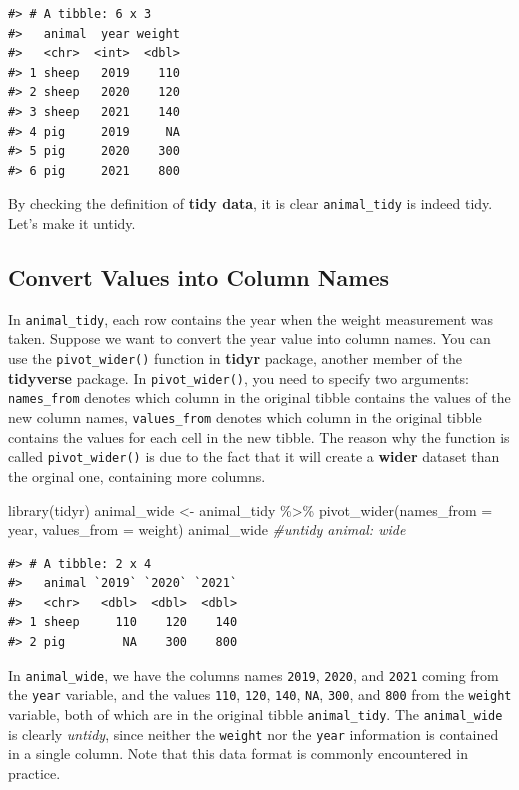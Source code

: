 \documentclass[
]{book}
\newenvironment{Shaded}{\begin{snugshade}}{\end{snugshade}}
\newcommand{\AttributeTok}[1]{\textcolor[rgb]{0.77,0.63,0.00}{#1}}
\newcommand{\CommentTok}[1]{\textcolor[rgb]{0.56,0.35,0.01}{\textit{#1}}}
\newcommand{\FunctionTok}[1]{\textcolor[rgb]{0.00,0.00,0.00}{#1}}
\newcommand{\NormalTok}[1]{#1}
\newcommand{\OtherTok}[1]{\textcolor[rgb]{0.56,0.35,0.01}{#1}}
\newcommand{\SpecialCharTok}[1]{\textcolor[rgb]{0.00,0.00,0.00}{#1}}
\begin{document}
\begin{verbatim}
#> # A tibble: 6 x 3
#>   animal  year weight
#>   <chr>  <int>  <dbl>
#> 1 sheep   2019    110
#> 2 sheep   2020    120
#> 3 sheep   2021    140
#> 4 pig     2019     NA
#> 5 pig     2020    300
#> 6 pig     2021    800
\end{verbatim}

By checking the definition of \textbf{tidy data}, it is clear \texttt{animal\_tidy} is indeed tidy. Let's make it untidy.

\hypertarget{tidy-wide}{%
\subsection{Convert Values into Column Names}\label{tidy-wide}}

In \texttt{animal\_tidy}, each row contains the year when the weight measurement was taken. Suppose we want to convert the year value into column names. You can use the \texttt{pivot\_wider()} function in \textbf{tidyr} package, another member of the \textbf{tidyverse} package. In \texttt{pivot\_wider()}, you need to specify two arguments: \texttt{names\_from} denotes which column in the original tibble contains the values of the new column names, \texttt{values\_from} denotes which column in the original tibble contains the values for each cell in the new tibble. The reason why the function is called \texttt{pivot\_wider()} is due to the fact that it will create a \textbf{wider} dataset than the orginal one, containing more columns.

\begin{Shaded}
\begin{Highlighting}[]
\FunctionTok{library}\NormalTok{(tidyr)}
\NormalTok{animal\_wide }\OtherTok{\textless{}{-}}\NormalTok{ animal\_tidy }\SpecialCharTok{\%\textgreater{}\%} \FunctionTok{pivot\_wider}\NormalTok{(}\AttributeTok{names\_from =}\NormalTok{ year,                                  }\AttributeTok{values\_from =}\NormalTok{ weight) }
\NormalTok{animal\_wide   }\CommentTok{\#untidy animal: wide}
\end{Highlighting}
\end{Shaded}

\begin{verbatim}
#> # A tibble: 2 x 4
#>   animal `2019` `2020` `2021`
#>   <chr>   <dbl>  <dbl>  <dbl>
#> 1 sheep     110    120    140
#> 2 pig        NA    300    800
\end{verbatim}

In \texttt{animal\_wide}, we have the columns names \texttt{2019}, \texttt{2020}, and \texttt{2021} coming from the \texttt{year} variable, and the values \texttt{110}, \texttt{120}, \texttt{140}, \texttt{NA}, \texttt{300}, and \texttt{800} from the \texttt{weight} variable, both of which are in the original tibble \texttt{animal\_tidy}. The \texttt{animal\_wide} is clearly \emph{untidy}, since neither the \texttt{weight} nor the \texttt{year} information is contained in a single column. Note that this data format is commonly encountered in practice.
\end{document}
